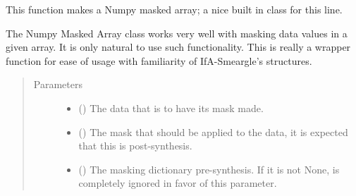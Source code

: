 \documentclass[letterpaper,10pt,english]{sphinxmanual}
\begin{document}
\begin{fulllineitems}
\label{\detokenize{python_docstrings/IfA_Smeargle.echo.echo_functions:IfA_Smeargle.echo.echo_functions.echo_create_masked_array}}
This function makes a Numpy masked array; a nice built in class for
this line.

The Numpy Masked Array class works very well with masking data values in
a given array. It is only natural to use such functionality. This is
really a wrapper function for ease of usage with familiarity of
IfA-Smeargle’s structures.
\begin{quote}\begin{description}
\item[{Parameters}] \leavevmode\begin{itemize}
\item {} 
 () \textendash{} The data that is to have its mask made.

\item {} 
 () \textendash{} The mask that should be applied to the data, it is expected that
this is post-synthesis.

\item {} 
 (\sphinxstyleliteralemphasis{\sphinxupquote{ (}}\sphinxstyleliteralemphasis{\sphinxupquote{)}}) \textendash{} The masking dictionary pre-synthesis. If it is not None,
 is completely ignored in favor of this parameter.

\end{itemize}

\end{description}\end{quote}

\end{fulllineitems}

\end{document}
